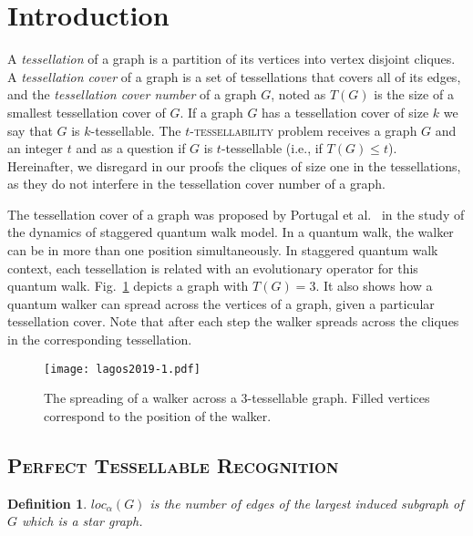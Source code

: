 \documentclass[9pt]{entcs} \usepackage{entcsmacro}
\newtheorem{defi}{Definition}[section]
\begin{document}
\section{Introduction}\label{sec:intro}
\label{sec:intro}
A \textit{tessellation} of a graph is a partition of its vertices into vertex disjoint cliques. 
A \textit{tessellation cover} of a graph is a set of tessellations that covers all of its edges, and the \textit{tessellation cover number} of a graph $G$, noted as $T(G)$ is the size of a smallest tessellation cover of $G$. 
If a graph $G$ has a tessellation cover of size $k$ we say that $G$ is $k$-tessellable.
The \textsc{$t$-tessellability} problem receives a graph $G$ and an integer $t$ and as a question if $G$ is $t$-tessellable (i.e., if $T(G) \leq t$).
Hereinafter, we disregard in our proofs the cliques of size one in the tessellations, as they do not interfere in the tessellation cover number of a graph.

The tessellation cover of a graph was proposed by Portugal et al.~\cite{PSFG16} in the study of the dynamics of staggered quantum walk model. In a quantum walk, the walker can be in more than one position simultaneously. In staggered quantum walk context, each tessellation is related with an evolutionary operator for this quantum walk.
Fig.~\ref{fig:evolution2} depicts a graph with  $T(G)=3$.
It also shows how a quantum walker can spread across the vertices of a graph, given a particular tessellation cover. Note that after each step the walker spreads across the cliques in the corresponding tessellation.

\begin{figure}
\centering
     \texttt{[image: lagos2019-1.pdf]}
     \caption{The spreading of a walker across a $3$-tessellable graph. Filled vertices correspond to the position of the walker. \label{fig:evolution2}}
\end{figure}


\subsection{\textsc{Perfect Tessellable Recognition}}

\begin{defi}
$loc_{\alpha}(G)$ is the number of edges of the largest induced subgraph of $G$ which is a star graph.
\end{defi}
\end{document}
